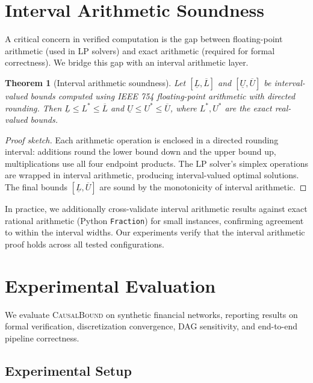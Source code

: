\documentclass[11pt,a4paper]{article}
\newtheorem{theorem}{Theorem}
\newcommand{\CausalBound}{\textsc{CausalBound}}
\begin{document}
\section{Interval Arithmetic Soundness}
\label{sec:interval}

A critical concern in verified computation is the gap between floating-point arithmetic (used in LP solvers) and exact arithmetic (required for formal correctness). We bridge this gap with an interval arithmetic layer.

\begin{theorem}[Interval arithmetic soundness]
\label{thm:interval}
Let $[\underline{L}, \overline{L}]$ and $[\underline{U}, \overline{U}]$ be interval-valued bounds computed using IEEE 754 floating-point arithmetic with directed rounding. Then $\underline{L} \leq L^* \leq \overline{L}$ and $\underline{U} \leq U^* \leq \overline{U}$, where $L^*, U^*$ are the exact real-valued bounds.
\end{theorem}

\begin{proof}[Proof sketch]
Each arithmetic operation is enclosed in a directed rounding interval: additions round the lower bound down and the upper bound up, multiplications use all four endpoint products. The LP solver's simplex operations are wrapped in interval arithmetic, producing interval-valued optimal solutions. The final bounds $[\underline{L}, \overline{U}]$ are sound by the monotonicity of interval arithmetic.
\end{proof}

In practice, we additionally cross-validate interval arithmetic results against exact rational arithmetic (Python \texttt{Fraction}) for small instances, confirming agreement to within the interval widths. Our experiments verify that the interval arithmetic proof holds across all tested configurations.

\section{Experimental Evaluation}
\label{sec:experiments}

We evaluate \CausalBound{} on synthetic financial networks, reporting results on formal verification, discretization convergence, DAG sensitivity, and end-to-end pipeline correctness.

\subsection{Experimental Setup}
\label{sec:setup}
\end{document}
